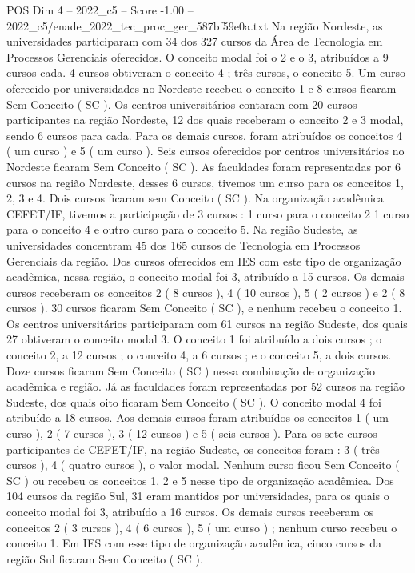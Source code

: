 \begin{textsample}{POS Dim 4 – 2022\_c5 – Score -1.00 – 2022\_c5/enade\_2022\_tec\_proc\_ger\_587bf59e0a.txt}
Na região Nordeste, as universidades participaram com 34 dos 327 cursos da Área de Tecnologia em Processos Gerenciais oferecidos.
O conceito modal foi o 2 e o 3, atribuídos a 9 cursos cada. 4 cursos obtiveram o conceito 4 ; três cursos, o conceito 5.
Um curso oferecido por universidades no Nordeste recebeu o conceito 1 e 8 cursos ficaram Sem Conceito ( SC ).
Os centros universitários contaram com 20 cursos participantes na região Nordeste, 12 dos quais receberam o conceito 2 e 3 modal, sendo 6 cursos para cada.
Para os demais cursos, foram atribuídos os conceitos 4 ( um curso ) e 5 ( um curso ).
Seis cursos oferecidos por centros universitários no Nordeste ficaram Sem Conceito ( SC ).
As faculdades foram representadas por 6 cursos na região Nordeste, desses 6 cursos, tivemos um curso para os conceitos 1, 2, 3 e 4.
Dois cursos ficaram sem Conceito ( SC ).
Na organização acadêmica CEFET/IF, tivemos a participação de 3 cursos : 1 curso para o conceito 2 1 curso para o conceito 4 e outro curso para o conceito 5.
Na região Sudeste, as universidades concentram 45 dos 165 cursos de Tecnologia em Processos Gerenciais da região.
Dos cursos oferecidos em IES com este tipo de organização acadêmica, nessa região, o conceito modal foi 3, atribuído a 15 cursos.
Os demais cursos receberam os conceitos 2 ( 8 cursos ), 4 ( 10 cursos ), 5 ( 2 cursos ) e 2 ( 8 cursos ). 30 cursos ficaram Sem Conceito ( SC ), e nenhum recebeu o conceito 1.
Os centros universitários participaram com 61 cursos na região Sudeste, dos quais 27 obtiveram o conceito modal 3.
O conceito 1 foi atribuído a dois cursos ; o conceito 2, a 12 cursos ; o conceito 4, a 6 cursos ; e o conceito 5, a dois cursos.
Doze cursos ficaram Sem Conceito ( SC ) nessa combinação de organização acadêmica e região.
Já as faculdades foram representadas por 52 cursos na região Sudeste, dos quais oito ficaram Sem Conceito ( SC ).
O conceito modal 4 foi atribuído a 18 cursos.
Aos demais cursos foram atribuídos os conceitos 1 ( um curso ), 2 ( 7 cursos ), 3 ( 12 cursos ) e 5 ( seis cursos ).
Para os sete cursos participantes de CEFET/IF, na região Sudeste, os conceitos foram : 3 ( três cursos ), 4 ( quatro cursos ), o valor modal.
Nenhum curso ficou Sem Conceito ( SC ) ou recebeu os conceitos 1, 2 e 5 nesse tipo de organização acadêmica.
Dos 104 cursos da região Sul, 31 eram mantidos por universidades, para os quais o conceito modal foi 3, atribuído a 16 cursos.
Os demais cursos receberam os conceitos 2 ( 3 cursos ), 4 ( 6 cursos ), 5 ( um curso ) ; nenhum curso recebeu o conceito 1.
Em IES com esse tipo de organização acadêmica, cinco cursos da região Sul ficaram Sem Conceito ( SC ).

\end{textsample}
